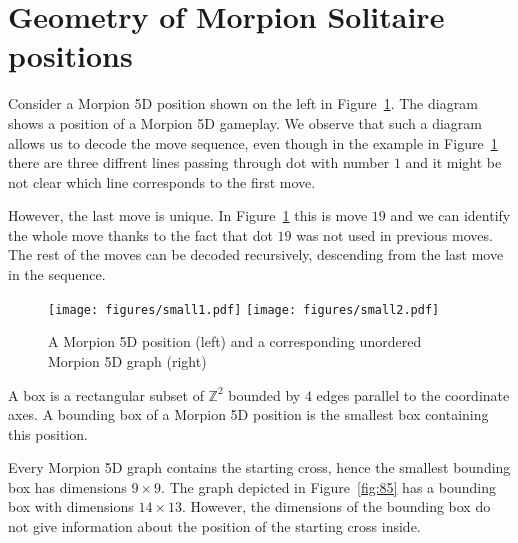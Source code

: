 \section{Geometry of Morpion Solitaire positions}


\begin{example}
Consider a Morpion 5D position shown on the left in Figure~\ref{fig:small}. 
The diagram shows a position of a Morpion 5D gameplay.
We observe that such a diagram allows us to decode the move sequence,
  even though in the example in Figure~\ref{fig:small} there are three diffrent lines passing through dot with number $1$
  and it might be not clear which line corresponds to the first move.

However, the last move is unique. In Figure~\ref{fig:small} this is move $19$ and we can identify the whole move thanks to the fact 
that dot $19$ was not used in previous moves. 
The rest of the moves can be decoded recursively, descending from the last move in the sequence. 
\end{example}


\begin{figure}
    \texttt{[image: figures/small1.pdf]}
    \texttt{[image: figures/small2.pdf]}
    \caption{\label{fig:small}
      A Morpion 5D position (left) and a corresponding unordered Morpion 5D graph (right)
    }
\end{figure}

\begin{definition}
A box is a rectangular subset of ${\mathbb Z}^2$ bounded by $4$ edges parallel to the coordinate axes. A bounding box of a Morpion 5D position is the smallest box
containing this position. %
\end{definition}

Every Morpion 5D graph contains the starting cross, hence the smallest bounding box has dimensions $9 \times 9$.
The graph depicted in Figure~\ref{fig:85} has a bounding box with dimensions $14 \times 13$.
However, the dimensions of the bounding box do not give information about the position of the starting cross inside. %

